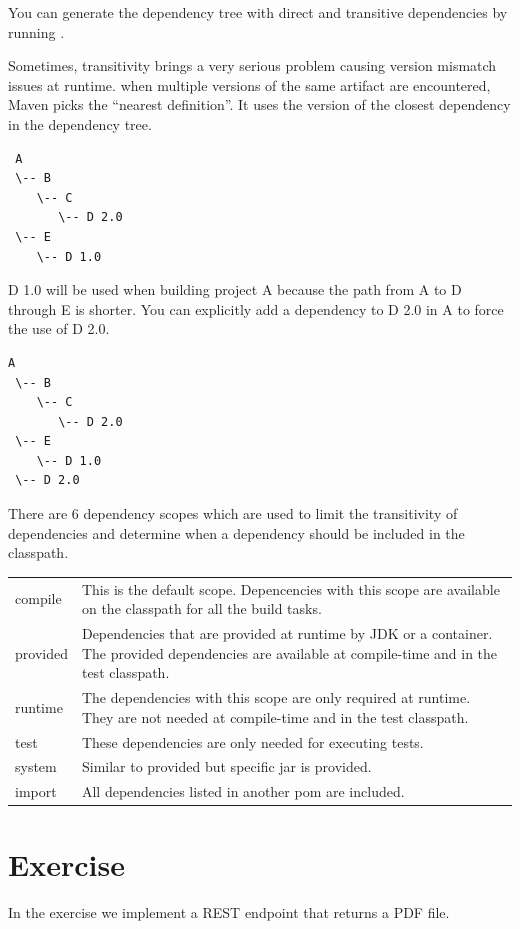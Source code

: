 You can generate the dependency tree with direct and transitive dependencies by running
 .

Sometimes, transitivity brings a very serious problem causing version mismatch issues at runtime.
when multiple versions of the same artifact are encountered, Maven picks the ``nearest definition''. It uses the version of the closest dependency in the dependency tree.

\begin{verbatim}
 A
 \-- B
    \-- C
       \-- D 2.0
 \-- E
    \-- D 1.0
\end{verbatim}

D 1.0 will be used when building project A because the path from A to D through E is shorter. You can explicitly add a dependency to D 2.0 in A to force the use of D 2.0.

\begin{verbatim}
A
 \-- B
    \-- C
       \-- D 2.0
 \-- E
    \-- D 1.0
 \-- D 2.0
 \end{verbatim}

There are 6 dependency scopes which are used to limit the transitivity of dependencies and determine when a dependency should be included in the classpath.

\begin{tabularx}{\textwidth}{ |l|X| } 
 \hline
 compile & 
This is the default scope. Depencencies with this scope are available on the classpath for all the build tasks.\\
provided &
Dependencies that are provided at runtime by JDK or a container. The provided dependencies are available at compile-time and in the test classpath.\\
runtime &
The dependencies with this scope are only required at runtime. They are not needed at compile-time and in the test classpath.\\
test &
These dependencies are only needed for executing tests.\\
system &
Similar to provided but specific jar is provided.\\ 
import &
All dependencies listed in another pom are included.\\
\hline
\end{tabularx}

\section{Exercise}

In the exercise we implement a REST endpoint that returns a PDF file.

